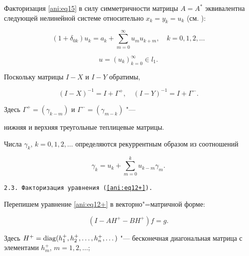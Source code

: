 Факторизация \eqref{ani:eq15} в силу симметричности матрицы $A=A^{*} $ эквивалентна следующей нелинейной системе относительно $x_{k} =y_{k} =u_{k} $ (см. \cite{ani:ArEn}):

\begin{equation} 

\label{ani:eq15+} 

(1+\delta _{0k} )u_{k} =a_{k} +\sum\limits _{m=0}^{\infty }u_{m} u_{k+m}   ,\quad  k=0, 1, 2, \dots \end{equation}

\[

u=\left(u_{k} \right)_{k=0}^{\infty } \in l_{1} .

\]



Поскольку  матрицы $I-X$ и $I-Y$ обратимы, 

\begin{equation}\label{ani:eq__16_}

 (I-X) ^{-1} =I+\Gamma ^{+} ,\quad  (I-Y) ^{-1} =I+\Gamma ^{-} .

\end{equation}

Здесь $\Gamma ^{+} =\left(\gamma _{k-m} \right)$ и $\Gamma ^{-} =\left(\gamma _{m-k} \right)$ "--- 

нижняя и верхняя треугольные теплицевые матрицы.  

Числа $\gamma _{k} $, $k= 0, 1, 2, \dots$ определяются  рекуррентным образом из соотношений

\begin{equation}\label{ani:eq__17_}

 \gamma _{k} =u_{k} +\sum\limits _{m=0}^{k}u_{k-m} \gamma _{m}.

\end{equation}



\smallskip



\texttt{2.3. Факторизация уравнения (\ref{ani:eq12+}).}

Перепишем уравнение \eqref{ani:eq12+} в векторно"=матричной форме:

\begin{equation}\label{ani:eq__18_}

\left({I}-AH^{+} -BH^{+} \right)f=g.

\end{equation}

Здесь $H^{+} =\mathop{\rm diag} (h_{1}^{+} ,  h_{2}^{+} ,\dots , h_{n}^{+} ,  \dots )$ "--- бесконечная диагональная матрица с элементами $h_{m}^{+} $, $m=1, 2, \dots$; 

